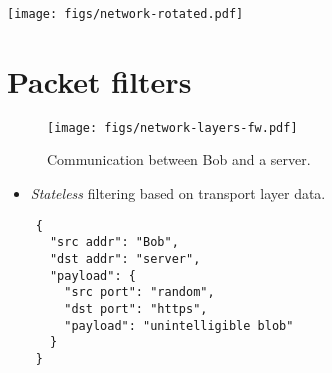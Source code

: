 \begin{frame}
  \centering
  \texttt{[image: figs/network-rotated.pdf]}

\end{frame}


\section{Packet filters}

\begin{frame}
  \begin{figure}
    \texttt{[image: figs/network-layers-fw.pdf]}
    \caption{Communication between Bob and a server.}
  \end{figure}
\end{frame}

\begin{frame}[fragile]
  \begin{definition}
    \begin{itemize}
      \item \emph{Stateless} filtering based on transport layer data.
    \end{itemize}
  \end{definition}

  \begin{verbatim}
    {
      "src addr": "Bob",
      "dst addr": "server",
      "payload": {
        "src port": "random",
        "dst port": "https",
        "payload": "unintelligible blob"
      }
    }
  \end{verbatim}
\end{frame}

